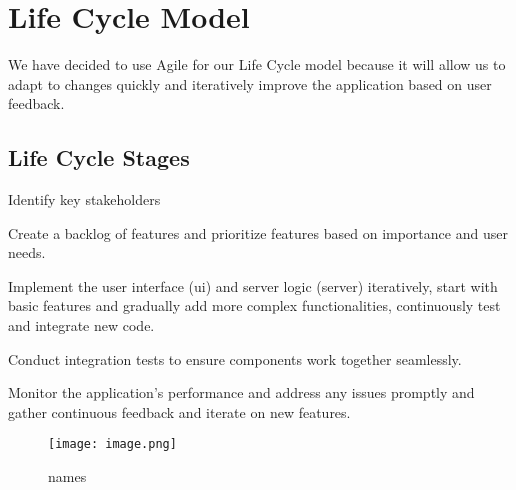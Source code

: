 \documentclass{article}
\begin{document}
\section{Life Cycle Model}
We have decided to use Agile for our Life Cycle model because it will allow us to adapt to changes quickly and iteratively improve the application based on user feedback.

\subsection{Life Cycle Stages}
Identify key stakeholders

Create a backlog of features and prioritize features based on importance and user needs.

Implement the user interface (ui) and server logic (server) iteratively,
start with basic features and gradually add more complex functionalities,
continuously test and integrate new code.

Conduct integration tests to ensure components work together seamlessly.

Monitor the application's performance and address any issues promptly and gather continuous feedback and iterate on new features.


\begin{figure}[H]
    \centering
    \texttt{[image: image.png]}
    \caption{names}
\end{figure}
\end{document}
